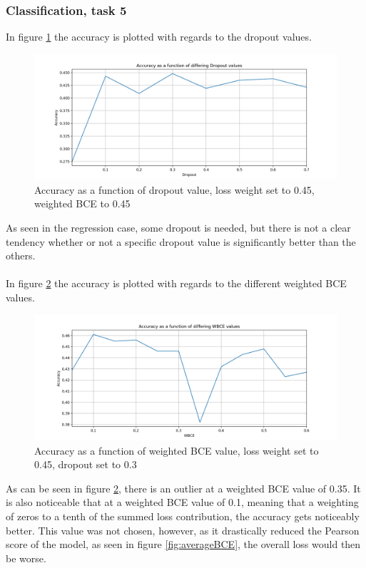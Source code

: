 \subsubsection{Classification, task 5}
In figure \ref{fig:dropoutacc} the accuracy is plotted with regards to the dropout values.
\begin{figure}[H]
    \centering
        \includegraphics[width=\textwidth]{pictures/DropoutPlotAcc.png}
        \caption{Accuracy as a function of dropout value, loss weight set to 0.45, weighted BCE to 0.45}
        \label{fig:dropoutacc}
\end{figure}
As seen in the regression case, some dropout is needed, but there is not a clear tendency whether or not a specific dropout value is significantly better than the others.\\
\\
In figure \ref{fig:bceacc} the accuracy is plotted with regards to the different weighted BCE values.
\begin{figure}[H]
    \centering
        \includegraphics[width=\textwidth]{pictures/WBCEPlotAcc.png}
        \caption{Accuracy as a function of weighted BCE value, loss weight set to 0.45, dropout set to 0.3}
        \label{fig:bceacc}
\end{figure}
As can be seen in figure \ref{fig:bceacc}, there is an outlier at a weighted BCE value of 0.35. It is also noticeable that at a weighted BCE value of 0.1, meaning that a weighting of zeros to a tenth of the summed loss contribution, the accuracy gets noticeably better. This value was not chosen, however, as it drastically reduced the Pearson score of the model, as seen in figure \ref{fig:averageBCE}, the overall loss would then be worse. \\
